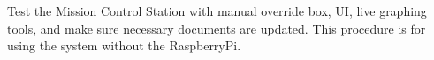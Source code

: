 Test the Mission Control Station with manual override box, UI, live graphing tools, and make sure necessary documents are updated.
This procedure is for using the system without the RaspberryPi.
